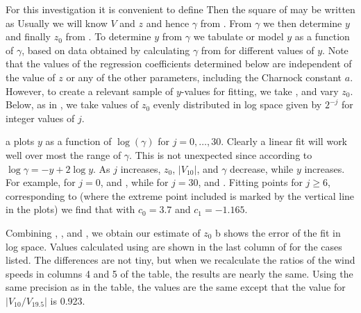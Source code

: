 \documentclass[12pt,notitlepage]{article}
\newcommand{\z}[1]{\mbox{$ z_{#1} $}}
\begin{document}
For this investigation it is convenient to define
\eql{y}{y = \log(z/\z0) \quad \mbox{so that} \quad \z0 = z e^{-y} . }
Then the square of  may be written as
Usually we will know $V$ and $z$ and hence $\gamma$ from .
From $\gamma$ we then determine $y$ and finally \z0 from .
To determine $y$ from $\gamma$ we  tabulate or model $y$
as a function of $\gamma$, based on data obtained by calculating
$\gamma$ from  for different values of $y$.
Note that the values of the regression coefficients determined below
are independent of the value of $z$ or any of the other parameters,
including the Charnock constant $a$.
However, to create a relevant sample of $y$-values for fitting, we
take , and vary \z0.
Below, as in , we take values of \z0 evenly distributed
in log space given by $2^{-j}$ for integer values of $j$.

\newcommand{\fitem}[3]{\begin{figure}[hb] \normalspacing
 \caption{{#2}\label{fig:#1}} \medskip
 \centerline{{\sffamily\upshape\bfseries
 {#3}}} \end{figure}}

a plots $y$ as a function of $\log(\gamma)$ for $j =
0, \ldots, 30$.
Clearly a linear fit will work well over most the range of $\gamma$.  
This is not unexpected since according to  $\log \gamma = -
y + 2 \log y$.
As $j$ increases, \z0, $|V_{10}|$, and $\gamma$ decrease, while $y$
increases.
For example, for $j = 0$, \mks{\z0 = 1}{m} and ,
while for $j = 30$, \mks{\z0 \approx 10^{-9}}{m} and .
Fitting points for $j \ge 6$, corresponding to 
(where the extreme point included is marked by the vertical line in
the plots) we find that
with $c_0 = 3.7$ and $c_1 = -1.165$.

Combining , , and , we obtain our
estimate of \z0
b shows the error of the fit in log space.
Values calculated using  are shown in the last column of
 for the cases listed.
The differences are not tiny, but when we recalculate the ratios of
the wind speeds in columns 4 and 5 of the table, the results are
nearly the same.
Using the same precision as in the table, the values are the same
except that the value for $|V_{10}/V_{19.5}|$ is 0.923.
\end{document}
